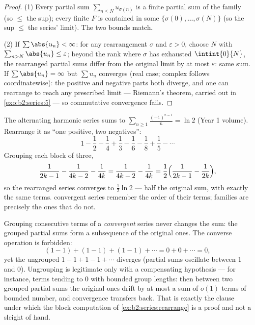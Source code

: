 \begin{proof}
(1) Every partial sum $\sum_{n \leq N} u_{\sigma(n)}$ is a finite
partial sum of the family (so $\leq$ the sup); every finite $F$ is
contained in some $\{\sigma(0), \dots, \sigma(N)\}$ (so the sup
$\leq$ the series' limit). The two bounds match.

(2) If $\sum\abs{u_n} < \infty$: for any rearrangement $\sigma$ and
$\varepsilon > 0$, choose $N$ with $\sum_{n > N}\abs{u_n} \leq
\varepsilon$; beyond the rank where $\sigma$ has exhausted
$\intint{0}{N}$, the rearranged partial sums differ from the
original limit by at most $\varepsilon$: same sum. If $\sum
\abs{u_n} = \infty$ but $\sum u_n$ converges (real case; complex
follows coordinatewise): the positive and negative parts both
diverge, and one can rearrange to reach any prescribed limit
--- Riemann's theorem, carried out in \cref{exo:b2:series:5} ---
so commutative convergence fails.
\end{proof}

\begin{example}\label{ex:b2:series:rearrange}
The alternating harmonic series sums to
$\sum_{n\geq1}\frac{(-1)^{n-1}}{n} = \ln 2$ (Year 1
volume). Rearrange it as ``one positive, two negatives'':
\[
1 - \frac12 - \frac14 + \frac13 - \frac16 - \frac18 + \frac15 -
\cdots
\]
Grouping each block of three,
\[
\frac{1}{2k-1} - \frac{1}{4k-2} - \frac1{4k}
= \frac{1}{4k-2} - \frac{1}{4k}
= \frac12\Bigl(\frac{1}{2k-1} - \frac1{2k}\Bigr),
\]
so the rearranged series converges to $\frac12\ln 2$ --- half the
original sum, with exactly the same terms. 
convergent series remember the order of their terms; 
families are precisely the ones that do not.
\end{example}

\begin{example}\label{ex:b2:series:grouping}
Grouping consecutive terms of a \emph{convergent} series never
changes the sum: the grouped partial sums form a subsequence of
the original ones. The converse operation is forbidden:
\[
(1 - 1) + (1 - 1) + (1 - 1) + \cdots = 0 + 0 + \cdots = 0,
\]
yet the ungrouped $1 - 1 + 1 - 1 + \cdots$ diverges (partial
sums oscillate between $1$ and $0$). Ungrouping is legitimate
only with a compensating hypothesis --- for instance, terms
tending to $0$ with bounded group lengths: then between two
grouped partial sums the original ones drift by at most a sum of
$o(1)$ terms of bounded number, and convergence transfers back.
That is exactly the clause under which the block computation of
\cref{ex:b2:series:rearrange} is a proof and not a sleight of
hand.
\end{example}

